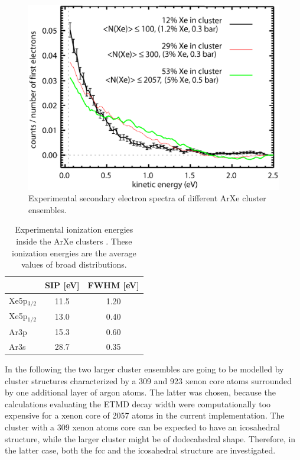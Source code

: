 \begin{figure}
 \centering
 \includegraphics[scale=0.5]{pics/arxe_cluster_exp_groessenvergleich.eps}
 \caption{Experimental secondary electron spectra of different ArXe
          cluster ensembles.}
 \label{figure:arxe_exp}
\end{figure}

\begin{table}
 \centering
 \caption{Experimental ionization energies inside the ArXe clusters
          \cite{Foerstel_private}. These ionization energies are the
          average values of broad distributions.}
 \begin{tabular}{lcc}
  \toprule
             & SIP [eV]  & FWHM [eV] \\
  \midrule
   Xe5p$_{3/2}$ & 11.5   & 1.20 \\
   Xe5p$_{1/2}$ & 13.0   & 0.40 \\
   Ar3p         & 15.3   & 0.60 \\
   Ar3s         & 28.7   & 0.35 \\
  \bottomrule
 \end{tabular}
 \label{table:exp_arxe_ionization}
\end{table}

In the following the two larger cluster ensembles are going to be modelled
by cluster structures characterized by a 309 and 923 xenon core atoms surrounded
by one additional layer of argon atoms. The latter was chosen, because the
calculations evaluating the ETMD decay width were computationally
too expensive for a xenon core of 2057 atoms in the current implementation.
The cluster with a 309 xenon atoms core can be expected to have an icosahedral
structure, while the larger cluster might be of dodecahedral shape. Therefore,
in the latter case, both the fcc and the icosahedral structure are investigated.

